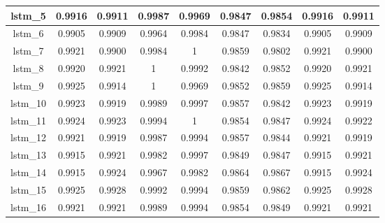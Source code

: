 \begin{table}[p]
\begin{tabular} {|c|c|c|c|c|c|c|c|c| }
        lstm\_5  & 0.9916                        & 0.9911                         & 0.9987                      & 0.9969                  & 0.9847 & 0.9854 & 0.9916 & 0.9911 \\ \hline
        lstm\_6  & 0.9905                        & 0.9909                         & 0.9964                      & 0.9984                  & 0.9847 & 0.9834 & 0.9905 & 0.9909 \\ \hline
        lstm\_7  & 0.9921                        & 0.9900                         & 0.9984                      & 1                       & 0.9859 & 0.9802 & 0.9921 & 0.9900 \\ \hline
        lstm\_8  & 0.9920                        & 0.9921                         & 1                           & 0.9992                  & 0.9842 & 0.9852 & 0.9920 & 0.9921 \\ \hline
        lstm\_9  & 0.9925                        & 0.9914                         & 1                           & 0.9969                  & 0.9852 & 0.9859 & 0.9925 & 0.9914 \\ \hline
        lstm\_10 & 0.9923                        & 0.9919                         & 0.9989                      & 0.9997                  & 0.9857 & 0.9842 & 0.9923 & 0.9919 \\ \hline
        lstm\_11 & 0.9924                        & 0.9923                         & 0.9994                      & 1                       & 0.9854 & 0.9847 & 0.9924 & 0.9922 \\ \hline
        lstm\_12 & 0.9921                        & 0.9919                         & 0.9987                      & 0.9994                  & 0.9857 & 0.9844 & 0.9921 & 0.9919 \\ \hline
        lstm\_13 & 0.9915                        & 0.9921                         & 0.9982                      & 0.9997                  & 0.9849 & 0.9847 & 0.9915 & 0.9921 \\ \hline
        lstm\_14 & 0.9915                        & 0.9924                         & 0.9967                      & 0.9982                  & 0.9864 & 0.9867 & 0.9915 & 0.9924 \\ \hline
        lstm\_15 & 0.9925                        & 0.9928                         & 0.9992                      & 0.9994                  & 0.9859 & 0.9862 & 0.9925 & 0.9928 \\ \hline
        lstm\_16 & 0.9921                        & 0.9921                         & 0.9989                      & 0.9994                  & 0.9854 & 0.9849 & 0.9921 & 0.9921 \\ \hline

\end{tabular}
\end{table}
